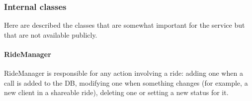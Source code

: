 \pagebreak
\subsubsection{Internal classes} %
\label{ssub:internal_classes}
Here are described the classes that are somewhat important for the service but that are not available publicly.

\paragraph{RideManager} %
\label{par:ridemanager}
RideManager is responsible for any action involving a ride: adding one when a call is added to the DB, modifying one when something changes (for example, a new client in a shareable ride), deleting one or setting a new status for it.

